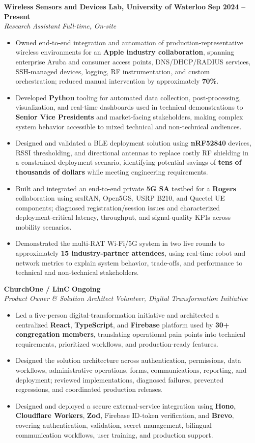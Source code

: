 \documentclass[letterpaper,11pt]{article}
\newcommand{\resumeSubheading}[4]{
  \textbf{#1} \hfill \textbf{#2} \\
  \textit{#3} \hfill \textit{#4} \\
}
\begin{document}
\resumeSubheading
{Wireless Sensors and Devices Lab, University of Waterloo}{Sep 2024 -- Present}
{Research Assistant}{Full-time, On-site}
\begin{itemize}
  \item Owned end-to-end integration and automation of production-representative wireless environments for an \textbf{Apple industry collaboration}, spanning enterprise Aruba and consumer access points, DNS/DHCP/RADIUS services, SSH-managed devices, logging, RF instrumentation, and custom orchestration; reduced manual intervention by approximately \textbf{70\%}.
  \item Developed \textbf{Python} tooling for automated data collection, post-processing, visualization, and real-time dashboards used in technical demonstrations to \textbf{Senior Vice Presidents} and market-facing stakeholders, making complex system behavior accessible to mixed technical and non-technical audiences.
  \item Designed and validated a BLE deployment solution using \textbf{nRF52840} devices, RSSI thresholding, and directional antennas to replace costly RF shielding in a constrained deployment scenario, identifying potential savings of \textbf{tens of thousands of dollars} while meeting engineering requirements.
  \item Built and integrated an end-to-end private \textbf{5G SA} testbed for a \textbf{Rogers} collaboration using srsRAN, Open5GS, USRP B210, and Quectel UE components; diagnosed registration/session issues and characterized deployment-critical latency, throughput, and signal-quality KPIs across mobility scenarios.
  \item Demonstrated the multi-RAT Wi-Fi/5G system in two live rounds to approximately \textbf{15 industry-partner attendees}, using real-time robot and network metrics to explain system behavior, trade-offs, and performance to technical and non-technical stakeholders.
\end{itemize}

\newpage
\resumeSubheading
{ChurchOne / LinC}{Ongoing}
{Product Owner \& Solution Architect}{Volunteer, Digital Transformation Initiative}
\begin{itemize}
  \item Led a five-person digital-transformation initiative and architected a centralized \textbf{React}, \textbf{TypeScript}, and \textbf{Firebase} platform used by \textbf{30+ congregation members}, translating operational pain points into technical requirements, prioritized workflows, and production-ready features.
  \item Designed the solution architecture across authentication, permissions, data workflows, administrative operations, forms, communications, reporting, and deployment; reviewed implementations, diagnosed failures, prevented regressions, and coordinated production releases.
  \item Designed and deployed a secure external-service integration using \textbf{Hono}, \textbf{Cloudflare Workers}, \textbf{Zod}, Firebase ID-token verification, and \textbf{Brevo}, covering authentication, validation, secret management, bilingual communication workflows, user training, and production support.
\end{itemize}
\end{document}
